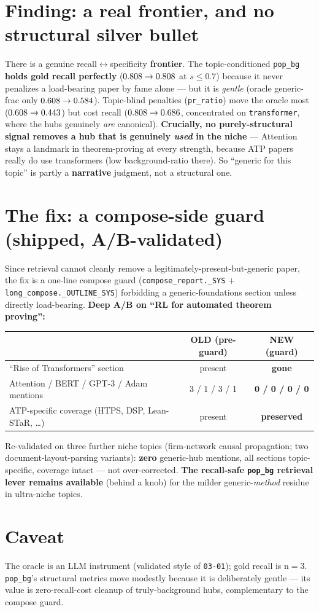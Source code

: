 \documentclass[11pt]{article}
\begin{document}
\section*{Finding: a real frontier, and no structural silver bullet}
There is a genuine recall$\leftrightarrow$specificity \textbf{frontier}. The topic-conditioned
\texttt{pop\_bg} \textbf{holds gold recall perfectly} ($0.808\rightarrow0.808$ at $s\le0.7$)
because it never penalizes a load-bearing paper by fame alone --- but it is \emph{gentle} (oracle
generic-frac only $0.608\rightarrow0.584$). Topic-blind penalties (\texttt{pr\_ratio})
move the oracle most ($0.608\rightarrow0.443$) but cost recall
($0.808\rightarrow0.686$, concentrated on \texttt{transformer}, where the hubs genuinely
\emph{are} canonical). \textbf{Crucially, no purely-structural signal removes a hub that is genuinely
\emph{used} in the niche} --- Attention stays a landmark in theorem-proving at every strength, because
ATP papers really do use transformers (low background-ratio there). So ``generic for this topic'' is
partly a \textbf{narrative} judgment, not a structural one.

\section*{The fix: a compose-side guard (shipped, A/B-validated)}
Since retrieval cannot cleanly remove a legitimately-present-but-generic paper, the fix is a
one-line compose guard (\texttt{compose\_report.\_SYS} + \texttt{long\_compose.\_OUTLINE\_SYS})
forbidding a generic-foundations section unless directly load-bearing. \textbf{Deep A/B on
``RL for automated theorem proving'':}

\begin{center}\begin{tabular}{lcc}
\toprule
 & OLD (pre-guard) & NEW (guard) \\
\midrule
``Rise of Transformers'' section & present & \textbf{gone} \\
Attention / BERT / GPT-3 / Adam mentions & 3 / 1 / 3 / 1 & \textbf{0 / 0 / 0 / 0} \\
ATP-specific coverage (HTPS, DSP, Lean-STaR, \dots) & present & \textbf{preserved} \\
\bottomrule
\end{tabular}\end{center}

\noindent Re-validated on three further niche topics (firm-network causal propagation; two
document-layout-parsing variants): \textbf{zero} generic-hub mentions, all sections topic-specific,
coverage intact --- not over-corrected. \textbf{The recall-safe \texttt{pop\_bg} retrieval lever
remains available} (behind a knob) for the milder generic-\emph{method} residue in ultra-niche topics.

\section*{Caveat}
The oracle is an LLM instrument (validated style of \texttt{03-01}); gold recall is n$=3$.
\texttt{pop\_bg}'s structural metrics move modestly because it is deliberately gentle --- its value is
zero-recall-cost cleanup of truly-background hubs, complementary to the compose guard.
\end{document}
